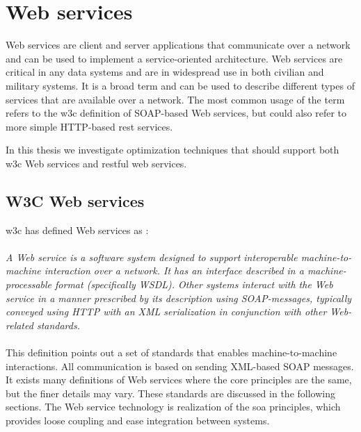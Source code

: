 \section{Web services}
\label{web-services}
Web services are client and server applications that communicate over a
network and can be used to implement a service-oriented architecture. Web
services are critical in any data systems and are in widespread use in both
civilian and military systems. It is a broad term and can be used to describe
different types of services that are available over a network. The most common
usage of the term refers to the \gls{w3c} definition of SOAP-based Web
services, but could also refer to more simple HTTP-based \gls{rest} services.

In this thesis we investigate optimization techniques that should support both
\gls{w3c} Web services and \gls{rest}ful web services.

\subsection{W3C Web services}

\gls{w3c} has defined Web services as \cite{wrc-web-service}:

\paragraph{}
\textit{
    A Web service is a software system designed to support interoperable
    machine-to-machine interaction over a network. It has an interface described in
    a machine-processable format (specifically WSDL). Other systems interact with
    the Web service in a manner prescribed by its description using SOAP-messages,
    typically conveyed using HTTP with an XML serialization in conjunction with
    other Web-related standards.
}

\paragraph{}

This definition points out a set of standards that enables machine-to-machine
interactions. All communication is based on sending XML-based SOAP messages.
It exists many definitions of Web services where the core principles are the
same, but the finer details may vary.  These standards are discussed in the
following sections. The Web service technology is realization of the \gls{soa}
principles, which provides loose coupling and ease integration between systems.

